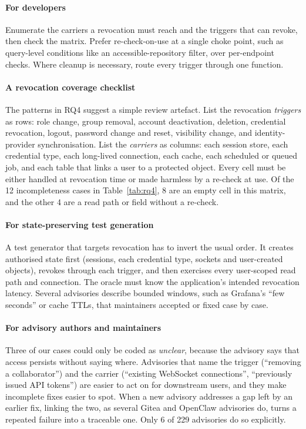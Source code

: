 \documentclass[preprint,12pt]{elsarticle}
\begin{document}
\paragraph{For developers}
Enumerate the carriers a revocation must reach and the triggers that can revoke, then check the matrix.
Prefer re-check-on-use at a single choke point, such as query-level conditions like an accessible-repository
filter, over per-endpoint checks. Where cleanup is necessary, route every trigger through one function.

\paragraph{A revocation coverage checklist}
The patterns in RQ4 suggest a simple review artefact. List the revocation \emph{triggers} as rows: role
change, group removal, account deactivation, deletion, credential revocation, logout, password change and
reset, visibility change, and identity-provider synchronisation. List the \emph{carriers} as columns: each
session store, each credential type, each long-lived connection, each cache, each scheduled or queued job, and
each table that links a user to a protected object. Every cell must be either handled at revocation time or
made harmless by a re-check at use. Of the 12 incompleteness cases in Table~\ref{tab:rq4}, 8 are an empty
cell in this matrix, and the other 4 are a read path or field without a re-check.

\paragraph{For state-preserving test generation}
A test generator that targets revocation has to invert the usual order. It creates authorised state
first (sessions, each credential type, sockets and user-created objects), revokes through each trigger, and then
exercises every user-scoped read path and connection. The oracle must know the application's intended
revocation latency. Several advisories describe bounded windows, such as Grafana's ``few seconds'' or cache TTLs, that
maintainers accepted or fixed case by case.

\paragraph{For advisory authors and maintainers}
Three of our cases could only be coded as \emph{unclear}, because the advisory says that access persists without saying
where. Advisories that name the trigger (``removing a collaborator'') and the carrier (``existing WebSocket
connections'', ``previously issued API tokens'') are easier to act on for downstream users, and they make incomplete
fixes easier to spot. When a new advisory addresses a gap left by an earlier fix, linking the two, as several Gitea and
OpenClaw advisories do, turns a repeated failure into a traceable one. Only 6 of 229 advisories do so explicitly.
\end{document}
